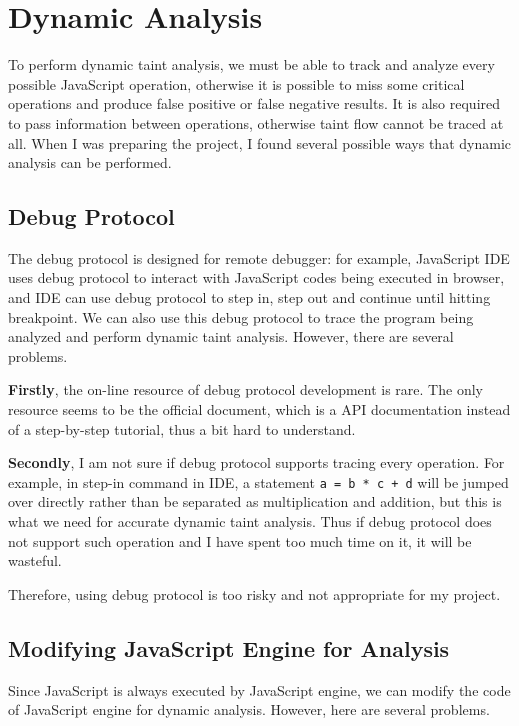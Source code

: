 \section{Dynamic Analysis}

To perform dynamic taint analysis, we must be able to track and analyze every possible JavaScript operation, otherwise it is possible to miss some critical operations and produce false positive or false negative results. It is also required to pass information between operations, otherwise taint flow cannot be traced at all. When I was preparing the project, I found several possible ways that dynamic analysis can be performed.

\subsection{Debug Protocol}

The debug protocol is designed for remote debugger: for example, JavaScript IDE uses debug protocol to interact with JavaScript codes being executed in browser, and IDE can use debug protocol to step in, step out and continue until hitting breakpoint. We can also use this debug protocol to trace the program being analyzed and perform dynamic taint analysis. However, there are several problems.

\textbf{Firstly}, the on-line resource of debug protocol development is rare. The only resource seems to be the official document, which is a API documentation instead of a step-by-step tutorial, thus a bit hard to understand.

\textbf{Secondly}, I am not sure if debug protocol supports tracing every operation. For example, in step-in command in IDE, a statement \texttt{a = b * c + d} will be jumped over directly rather than be separated as multiplication and addition, but this is what we need for accurate dynamic taint analysis. Thus if debug protocol does not support such operation and I have spent too much time on it, it will be wasteful.

Therefore, using debug protocol is too risky and not appropriate for my project.

\subsection{Modifying JavaScript Engine for Analysis}

Since JavaScript is always executed by JavaScript engine, we can modify the code of JavaScript engine for dynamic analysis. However, here are several problems.

